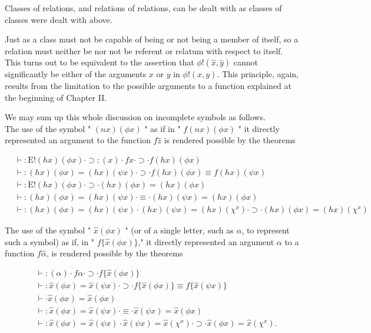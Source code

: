 \documentclass[10pt]{article}
\begin{document}
Classes of relations, and relations of relations, can be dealt with as classes of classes were dealt with above.

Just as a class must not be capable of being or not being a member of itself, so a relation must neither be nor not be referent or relatum with respect to itself. This turns out to be equivalent to the assertion that $\phi!(\hat{x}, \hat{y})$ cannot significantly be either of the arguments $x$ or $y$ in $\phi!(x, y)$. This principle, again, results from the limitation to the possible arguments to a function explained at the beginning of Chapter II.

We may sum up this whole discussion on incomplete symbols as follows.\\
The use of the symbol " $(n x)(\phi x)$ " as if in " $f(n x)(\phi x)$ " it directly represented an argument to the function $f \hat{z}$ is rendered possible by the theorems

$$
\begin{aligned}
& \vdash: \mathrm{E}!(h x)(\phi x) \cdot \supset:(x) \cdot f x \cdot \supset \cdot f(h x)(\phi x) \\
& \vdash:(h x)(\phi x)=(h x)(\psi x) \cdot \supset \cdot f(h x)(\phi x) \equiv f(h x)(\psi x) \\
& \vdash: \mathrm{E}!(h x)(\phi x) \cdot \supset \cdot(h x)(\phi x)=(h x)(\phi x) \\
& \vdash:(h x)(\phi x)=(h x)(\psi x) \cdot \equiv \cdot(h x)(\psi x)=(h x)(\phi x) \\
& \vdash:(h x)(\phi x)=(h x)(\psi x) \cdot(h x)(\psi x)=(h x)\left(\chi^{x}\right) \cdot \supset \cdot(h x)(\phi x)=(h x)\left(\chi^{x}\right)
\end{aligned}
$$

The use of the symbol " $\hat{x}(\phi x)$ " (or of a single letter, such as $\alpha$, to represent such a symbol) as if, in " $f\{\hat{x}(\phi x)\}$," it directly represented an argument $\alpha$ to a function $f \hat{\alpha}$, is rendered possible by the theorems

$$
\begin{aligned}
& \vdash:(\alpha) \cdot f \alpha \cdot \supset \cdot f\{\hat{x}(\phi x)\} \\
& \vdash: \hat{x}(\phi x)=\hat{x}(\psi x) \cdot \supset \cdot f\{\hat{x}(\phi x)\} \equiv f\{\hat{x}(\psi x)\} \\
& \vdash \cdot \hat{x}(\phi x)=\hat{x}(\phi x) \\
& \vdash: \hat{x}(\phi x)=\hat{x}(\psi x) \cdot \equiv \cdot \hat{x}(\psi x)=\hat{x}(\phi x) \\
& \vdash: \hat{x}(\phi x)=\hat{x}(\psi x) \cdot \hat{x}(\psi x)=\hat{x}\left(\chi^{x}\right) \cdot \supset \cdot \hat{x}(\phi x)=\hat{x}\left(\chi^{x}\right) .
\end{aligned}
$$
\end{document}
